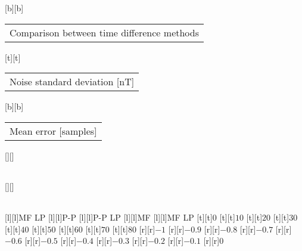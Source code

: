 %
%
[b][b]{\fontsize{8}{12}\selectfont \setlength{\tabcolsep}{0pt}\begin{tabular}{c}Comparison between time difference methods\end{tabular}}%
[t][t]{\fontsize{8}{12}\selectfont \setlength{\tabcolsep}{0pt}\begin{tabular}{c}Noise standard deviation [nT]\end{tabular}}%
[b][b]{\fontsize{8}{12}\selectfont \setlength{\tabcolsep}{0pt}\begin{tabular}{c}Mean error [samples]\end{tabular}}%
[][]{\fontsize{8}{12}\selectfont \setlength{\tabcolsep}{0pt}\begin{tabular}{c} \end{tabular}}%
[][]{\fontsize{4}{6}\selectfont \setlength{\tabcolsep}{0pt}\begin{tabular}{c} \end{tabular}}%
[l][l]{\fontsize{4}{6}\selectfont MF LP}%
[l][l]{\fontsize{4}{6}\selectfont P-P}%
[l][l]{\fontsize{4}{6}\selectfont P-P LP}%
[l][l]{\fontsize{4}{6}\selectfont MF}%
[l][l]{\fontsize{4}{6}\selectfont MF LP}%
%
\fontsize{6}{12}%
\selectfont%
%
[t][t]{$0$}%
[t][t]{$10$}%
[t][t]{$20$}%
[t][t]{$30$}%
[t][t]{$40$}%
[t][t]{$50$}%
[t][t]{$60$}%
[t][t]{$70$}%
[t][t]{$80$}%
%
[r][r]{$-1$}%
[r][r]{$-0.9$}%
[r][r]{$-0.8$}%
[r][r]{$-0.7$}%
[r][r]{$-0.6$}%
[r][r]{$-0.5$}%
[r][r]{$-0.4$}%
[r][r]{$-0.3$}%
[r][r]{$-0.2$}%
[r][r]{$-0.1$}%
[r][r]{$0$}%
%
%
